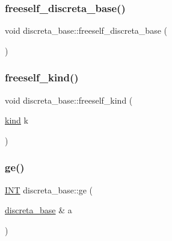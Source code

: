 \mbox{\label{classdiscreta__base_a8b1ec2cee4566034441e066dc2c027db}} 
\subsubsection{\texorpdfstring{freeself\+\_\+discreta\+\_\+base()}{freeself\_discreta\_base()}}
{\footnotesize\ttfamily void discreta\+\_\+base\+::freeself\+\_\+discreta\+\_\+base (\begin{DoxyParamCaption}{ }\end{DoxyParamCaption})}

\mbox{\label{classdiscreta__base_a63a23ada2165b3838fab719ed458cec8}} 
\subsubsection{\texorpdfstring{freeself\+\_\+kind()}{freeself\_kind()}}
{\footnotesize\ttfamily void discreta\+\_\+base\+::freeself\+\_\+kind (\begin{DoxyParamCaption}\item[{\mbox{\hyperlink{discreta_8h_aaf25ee7e2306d78c74ec7bc48f092e81}{kind}}}]{k }\end{DoxyParamCaption})}

\mbox{\label{classdiscreta__base_a06af05fc220a55e844849fe665545c03}} 
\subsubsection{\texorpdfstring{ge()}{ge()}}
{\footnotesize\ttfamily \mbox{\hyperlink{galois_8h_a09fddde158a3a20bd2dcadb609de11dc}{I\+NT}} discreta\+\_\+base\+::ge (\begin{DoxyParamCaption}\item[{\mbox{\hyperlink{classdiscreta__base}{discreta\+\_\+base}} \&}]{a }\end{DoxyParamCaption})}

